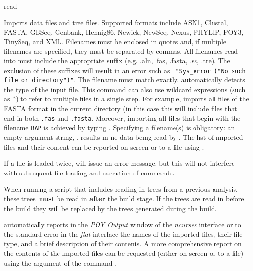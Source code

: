 
\begin{command}{read}{}


\begin{poydescription} 
Imports data files and tree files. Supported formats include ASN1, Clustal, FASTA,
GBSeq, Genbank, Hennig86, Newick, NewSeq, Nexus, PHYLIP, POY3,
TinySeq, and XML. Filenames must be enclosed in quotes and, if multiple
filenames are specified, they must be separated by commas. All filenames 
read into \poy must include the appropriate suffix (e.g. .aln, .fas, 
.fasta, .ss, .tre). The exclusion of these suffixes will result in an error such as \texttt{
"Sys\_error ("No such file or directory")"}. The filename must match exactly.
 automatically detects the type of the 
input file. This command can also use wildcard expressions (such as *) to
refer to multiple files in a single step. For example,  
imports all files of the FASTA format in the current directory (in this case 
this will include files that end in both \texttt{.fas} and \texttt{.fasta}. Moreover, 
importing all files that begin with the filename \texttt{BAP} is achieved by typing 
. Specifying a filename(s) is obligatory: 
an empty argument string, , results in no data being 
read by \poy. The list of imported files and their content
can be reported on screen or to a file using .

If a file is loaded twice, \poy will issue an error message, but this will not
interfere with subsequent file loading and execution of commands.

\begin{statement}
When running a script that includes reading in trees from a previous analysis, these trees {\bf must} be read 
in {\bf after} the build stage. If the trees are read in before the build they will be replaced by the trees 
generated during the build.
\end{statement}

\poy automatically reports in the \emph{POY Output} window of the \emph{ncurses}
interface or to the standard error in the \emph{flat} interface the names
of the imported files, their file type, and a brief description of
their contents. A more comprehensive report on the contents of the imported
files can be requested (either on screen or to a file) using the argument
 of the command .


\end{poydescription}
\end{command}
